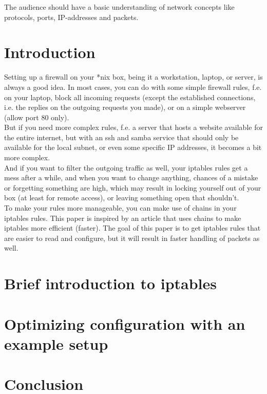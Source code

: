 \documentclass[a4paper,12pt]{article}
\begin{document}
The audience should have a basic understanding of network concepts like protocols, ports, IP-addresses and packets.

\pagebreak
\tableofcontents

\section{Introduction}
Setting up a firewall on your *nix box, being it a workstation, laptop, or server, is always a good idea. In most cases, you can do with some simple firewall rules, f.e. on your laptop, block all incoming requests (except the established connections, i.e. the replies on the outgoing requests you made), or on a simple webserver (allow port 80 only).\\

But if you need more complex rules, f.e. a server that hosts a website available for the entire internet, but with an ssh and samba service that should only be available for the local subnet, or even some specific IP addresses, it becomes a bit more complex.\\
And if you want to filter the outgoing traffic as well, your iptables rules get a mess after a while, and when you want to change anything, chances of a mistake or forgetting something are high, which may result in locking yourself out of your box (at least for remote access), or leaving something open that shouldn't.\\

To make your rules more manageable, you can make use of chains in your iptables rules. This paper is inspired by an article that uses chains to make iptables more efficient (faster). The goal of this paper is to get iptables rules that are easier to read and configure, but it will result in faster handling of packets as well.\\
\section{Brief introduction to iptables}
\section{Optimizing configuration with an example setup}
\section{Conclusion}
\end{document}
